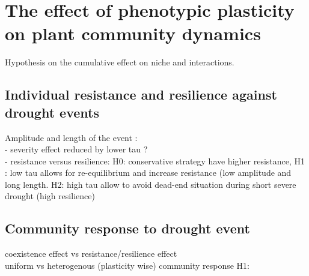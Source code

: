 
\chapter{The effect of phenotypic plasticity on plant community dynamics}
Hypothesis on the cumulative effect on niche and interactions.

\section{Individual resistance and resilience against drought events}
Amplitude and length of the event :\\
- severity effect reduced by lower tau ?\\
- resistance versus resilience: H0: conservative strategy have higher resistance, H1 : low tau allows for re-equilibrium and increase resistance (low amplitude and long length. H2: high tau allow to avoid dead-end situation during short severe drought (high resilience)
\section{Community response to drought event}
coexistence effect vs resistance/resilience effect\\
uniform vs heterogenous (plasticity wise) community response
H1: 

